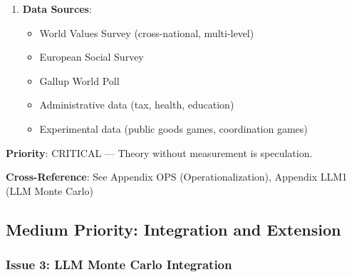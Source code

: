 \begin{tcolorbox}[colback=red!5!white, colframe=red!75!black, title=Status: Incomplete]
\begin{enumerate}
\item \textbf{Data Sources}:
    \begin{itemize}[nosep]
    \item World Values Survey (cross-national, multi-level)
    \item European Social Survey
    \item Gallup World Poll
    \item Administrative data (tax, health, education)
    \item Experimental data (public goods games, coordination games)
    \end{itemize}
\end{enumerate}

\textbf{Priority}: \colorbox{red!20}{CRITICAL} --- Theory without measurement is speculation.

\textbf{Cross-Reference}: See Appendix OPS (Operationalization), Appendix LLM1 (LLM Monte Carlo)
\end{tcolorbox}

\subsection{Medium Priority: Integration and Extension}

\subsubsection{Issue 3: LLM Monte Carlo Integration}

